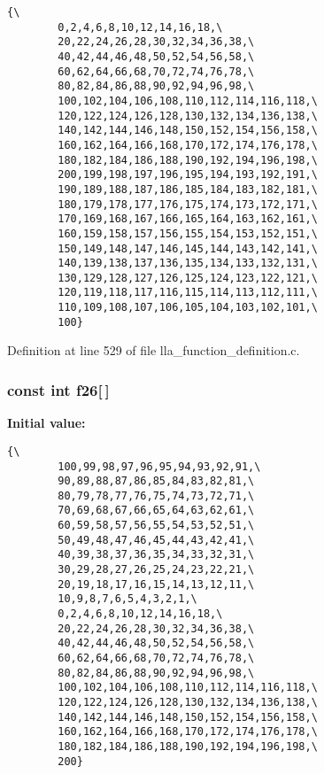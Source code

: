 \footnotesize\begin{verbatim}{\
        0,2,4,6,8,10,12,14,16,18,\
        20,22,24,26,28,30,32,34,36,38,\
        40,42,44,46,48,50,52,54,56,58,\
        60,62,64,66,68,70,72,74,76,78,\
        80,82,84,86,88,90,92,94,96,98,\
        100,102,104,106,108,110,112,114,116,118,\
        120,122,124,126,128,130,132,134,136,138,\
        140,142,144,146,148,150,152,154,156,158,\
        160,162,164,166,168,170,172,174,176,178,\
        180,182,184,186,188,190,192,194,196,198,\
        200,199,198,197,196,195,194,193,192,191,\
        190,189,188,187,186,185,184,183,182,181,\
        180,179,178,177,176,175,174,173,172,171,\
        170,169,168,167,166,165,164,163,162,161,\
        160,159,158,157,156,155,154,153,152,151,\
        150,149,148,147,146,145,144,143,142,141,\
        140,139,138,137,136,135,134,133,132,131,\
        130,129,128,127,126,125,124,123,122,121,\
        120,119,118,117,116,115,114,113,112,111,\
        110,109,108,107,106,105,104,103,102,101,\
        100}
\end{verbatim}\normalsize 


Definition at line 529 of file lla\_\-function\_\-definition.c.
\subsubsection{\setlength{\rightskip}{0pt plus 5cm}const int {\bf f26}[$\,$]}\label{lla__function__definition_8c_a25}


{\bf Initial value:}

\footnotesize\begin{verbatim}{\
        100,99,98,97,96,95,94,93,92,91,\
        90,89,88,87,86,85,84,83,82,81,\
        80,79,78,77,76,75,74,73,72,71,\
        70,69,68,67,66,65,64,63,62,61,\
        60,59,58,57,56,55,54,53,52,51,\
        50,49,48,47,46,45,44,43,42,41,\
        40,39,38,37,36,35,34,33,32,31,\
        30,29,28,27,26,25,24,23,22,21,\
        20,19,18,17,16,15,14,13,12,11,\
        10,9,8,7,6,5,4,3,2,1,\
        0,2,4,6,8,10,12,14,16,18,\
        20,22,24,26,28,30,32,34,36,38,\
        40,42,44,46,48,50,52,54,56,58,\
        60,62,64,66,68,70,72,74,76,78,\
        80,82,84,86,88,90,92,94,96,98,\
        100,102,104,106,108,110,112,114,116,118,\
        120,122,124,126,128,130,132,134,136,138,\
        140,142,144,146,148,150,152,154,156,158,\
        160,162,164,166,168,170,172,174,176,178,\
        180,182,184,186,188,190,192,194,196,198,\
        200}
\end{verbatim}\normalsize 



